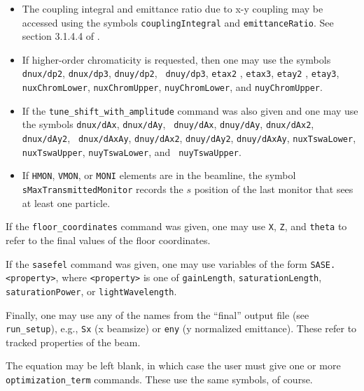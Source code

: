 \documentclass[11pt]{article}
\begin{document}
\begin{itemize}
\begin{itemize}
{\tt h11001}, {\tt h00111}, {\tt h20001}, {\tt h00201}, {\tt h10002}, {\tt h21000}, {\tt h30000}, {\tt h10110}, {\tt h10020},
{\tt h10200}, {\tt h22000}, {\tt h11110}, {\tt h00220}, {\tt h31000}, {\tt h40000}, {\tt h20110}, {\tt h11200}, {\tt h20020},
{\tt h20200}, {\tt h00310}, {\tt h00400}, {\tt dnux/dJx}, {\tt dnux/dJy},  and {\tt dnuy/dJy} 
may be used.  Table \ref{tab:drivingTerms} explains the meaning of the terms.
\item The coupling integral and emittance ratio due to x-y coupling may
be accessed using the symbols \verb|couplingIntegral| and
\verb|emittanceRatio|.  See section 3.1.4.4 of \cite{HAPE}.
\item If higher-order chromaticity is requested, then one may use the
  symbols {\tt dnux/dp2}, {\tt dnux/dp3}, {\tt dnuy/dp2}, {\tt
    dnuy/dp3}, {\tt etax2} , {\tt etax3}, {\tt etay2} , {\tt etay3},
  {\tt nuxChromLower}, {\tt nuxChromUpper}, {\tt nuyChromLower}, and
  {\tt nuyChromUpper}.
\item If the \verb|tune_shift_with_amplitude| command was also given
  and one may use the symbols {\tt dnux/dAx}, {\tt dnux/dAy}, {\tt
    dnuy/dAx}, {\tt dnuy/dAy}, {\tt dnux/dAx2}, {\tt dnux/dAy2}, {\tt
    dnux/dAxAy}, {\tt dnuy/dAx2}, {\tt dnuy/dAy2}, {\tt dnuy/dAxAy},
  {\tt nuxTswaLower}, {\tt nuxTswaUpper}, {\tt nuyTswaLower}, and {\tt
    nuyTswaUpper}.
  \item If {\tt HMON}, {\tt VMON}, or {\tt MONI} elements are in the
    beamline, the symbol {\tt sMaxTransmittedMonitor} records the
    $s$ position of the last monitor that sees at least one particle.
\end{itemize}

If the \verb|floor_coordinates| command was given, one may use
\verb|X|, \verb|Z|, and \verb|theta| to refer to the final values of
the floor coordinates.

If the \verb|sasefel| command was given, one may use variables of
the form \verb|SASE.<property>|, where \verb|<property>| is one
of \verb|gainLength|, \verb|saturationLength|, 
\verb|saturationPower|, or \verb|lightWavelength|.

Finally, one may use any of the names from the ``final'' output file
(see \verb|run_setup|), e.g., \verb|Sx| (x beamsize) or \verb|eny| (y
normalized emittance).  These refer to tracked properties of the beam.

The equation may be left blank, in which case the user must give one
or more \verb|optimization_term| commands.  These use the same
symbols, of course.


\end{itemize}
\end{document}
